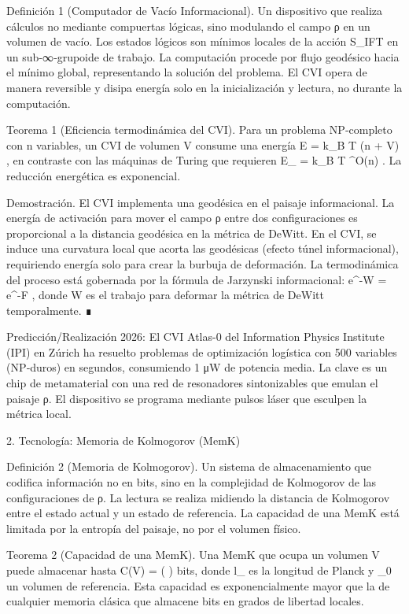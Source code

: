 \documentclass[12pt,twoside]{book}
\begin{document}
Definición 1 (Computador de Vacío Informacional). Un dispositivo que realiza cálculos no mediante compuertas lógicas, sino modulando el campo ρ en un volumen de vacío. Los estados lógicos son mínimos locales de la acción S_IFT en un sub‑∞‑grupoide de trabajo. La computación procede por flujo geodésico hacia el mínimo global, representando la solución del problema. El CVI opera de manera reversible y disipa energía solo en la inicialización y lectura, no durante la computación.

Teorema 1 (Eficiencia termodinámica del CVI). Para un problema NP‑completo con n variables, un CVI de volumen V consume una energía  E = k_B T  \cdot (n + \log V) , en contraste con las máquinas de Turing que requieren  E_{} = k_B T  ^{O(n)} . La reducción energética es exponencial.

Demostración. El CVI implementa una geodésica en el paisaje informacional. La energía de activación para mover el campo ρ entre dos configuraciones es proporcional a la distancia geodésica en la métrica de DeWitt. En el CVI, se induce una curvatura local que acorta las geodésicas (efecto túnel informacional), requiriendo energía solo para crear la burbuja de deformación. La termodinámica del proceso está gobernada por la fórmula de Jarzynski informacional:  \langle e^{-\beta W} \rangle = e^{-\beta \Delta F} , donde W es el trabajo para deformar la métrica de DeWitt temporalmente. ∎

Predicción/Realización 2026: El CVI Atlas-0 del Information Physics Institute (IPI) en Zúrich ha resuelto problemas de optimización logística con 500 variables (NP‑duros) en segundos, consumiendo 1 μW de potencia media. La clave es un chip de metamaterial con una red de resonadores sintonizables que emulan el paisaje ρ. El dispositivo se programa mediante pulsos láser que esculpen la métrica local.

2. Tecnología: Memoria de Kolmogorov (MemK)

Definición 2 (Memoria de Kolmogorov). Un sistema de almacenamiento que codifica información no en bits, sino en la complejidad de Kolmogorov de las configuraciones de ρ. La lectura se realiza midiendo la distancia de Kolmogorov entre el estado actual y un estado de referencia. La capacidad de una MemK está limitada por la entropía del paisaje, no por el volumen físico.

Teorema 2 (Capacidad de una MemK). Una MemK que ocupa un volumen V puede almacenar hasta  C(V) =  \ln\left(  \right)  bits, donde  l_{}  es la longitud de Planck y  _0  un volumen de referencia. Esta capacidad es exponencialmente mayor que la de cualquier memoria clásica que almacene bits en grados de libertad locales.
\end{document}
